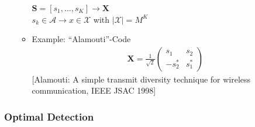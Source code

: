 \documentclass[a4paper, 10pt]{article}
\begin{document}
\begin{itemize}
\begin{itemize}
			$\mathbf{S}=[s_1,\dots ,s_K] \rightarrow \mathbf{X}$\\
			$s_k\in \mathcal{A} \rightarrow x\in\mathcal{X}$ with $|\mathcal{X}|=M^K$
			\item Example: ``Alamouti''-Code\\
			\begin{align*}
				\mathbf{X}=\frac{1}{\sqrt{2}}
				\begin{pmatrix}
					s_1 & s_2 \\
					-s_2^* & s_1^*
				\end{pmatrix}
			\end{align*}
			{\small[Alamouti: A simple transmit diversity technique for wireless communication, IEEE JSAC 1998]}
		\end{itemize}
\end{itemize}
\subsubsection{Optimal Detection}
\end{document}
